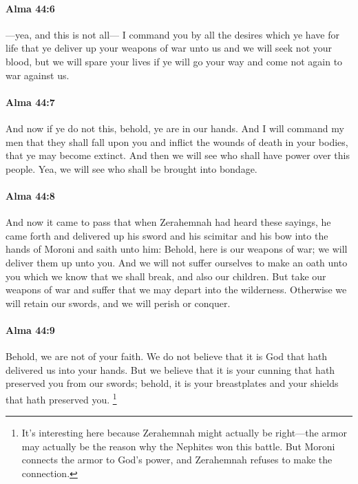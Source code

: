 		\paragraph{Alma 44:6} %
			\label{ALMA-44-6}

			---yea, and this is not all---
			I command you by all the desires which ye have for life
			that ye deliver up your weapons of war unto us
			and we will seek not your blood,
			but we will spare your lives if ye will go your way
			and come not again to war against us.

		\paragraph{Alma 44:7} %
			\label{ALMA-44-7}

			And now if ye do not this,
			behold, ye are in our hands.
			And I will command my men that they shall fall upon you
			and inflict the wounds of death in your bodies,
			that ye may become extinct.
			And then we will see who shall have power over this people.
			Yea, we will see who shall be brought into bondage.

		\paragraph{Alma 44:8} %
			\label{ALMA-44-8}

			And now it came to pass that when Zerahemnah had heard these sayings,
			he came forth and delivered up his sword and his scimitar and his bow
			into the hands of Moroni
			and saith unto him:
			Behold, here is our weapons of war;
			we will deliver them up unto you.
			And we will not suffer ourselves to make an oath unto you
			which we know that we shall break, and also our children.
			But take our weapons of war
			and suffer that we may depart into the wilderness.
			Otherwise we will retain our swords,
			and we will perish or conquer.

		\paragraph{Alma 44:9} %
			\label{ALMA-44-9}

			Behold, we are not of your faith.
			We do not believe that it is God that hath delivered us into your hands.
			But we believe that it is your cunning that hath preserved you from our swords;
			behold, it is your breastplates and your shields that hath preserved you.%
				\footnote{%
					It's interesting here because Zerahemnah might actually be right---the armor may actually be the reason why the Nephites won this battle. But Moroni connects the armor to God's power, and Zerahemnah refuses to make the connection.
					}

